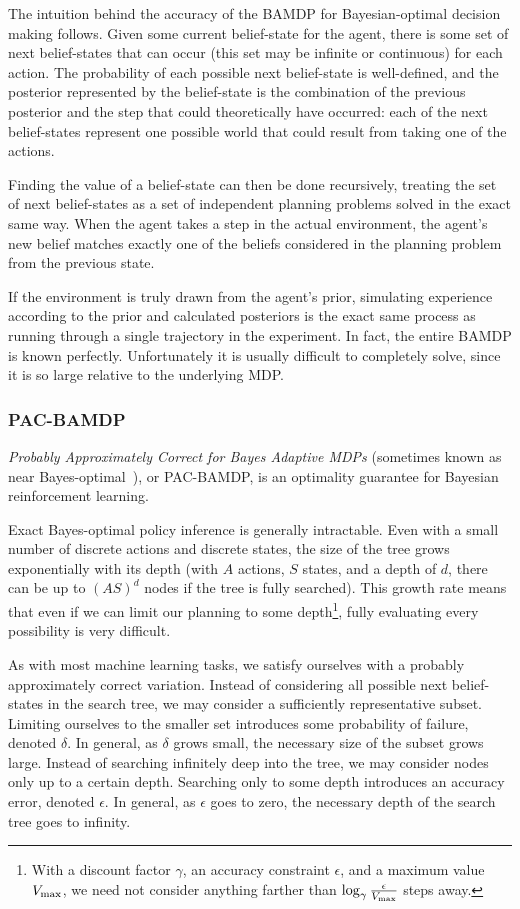 The intuition behind the accuracy of the BAMDP for Bayesian-optimal decision making follows. Given some current belief-state for the agent, there is some set of next belief-states that can occur (this set may be infinite or continuous) for each action. The probability of each possible next belief-state is well-defined, and the posterior represented by the belief-state is the combination of the previous posterior and the step that could theoretically have occurred: each of the next belief-states represent one possible world that could result from taking one of the actions.

Finding the value of a belief-state can then be done recursively, treating the set of next belief-states as a set of independent planning problems solved in the exact same way. When the agent takes a step in the actual environment, the agent's new belief matches exactly one of the beliefs considered in the planning problem from the previous state.

If the environment is truly drawn from the agent's prior, simulating experience according to the prior and calculated posteriors is the exact same process as running through a single trajectory in the experiment. In fact, the entire BAMDP is known perfectly. Unfortunately it is usually difficult to completely solve, since it is so large relative to the underlying MDP.

\subsubsection{PAC-BAMDP}

\emph{Probably Approximately Correct for Bayes Adaptive MDPs} (sometimes known as near Bayes-optimal~\cite{kolter09}), or PAC-BAMDP, is an optimality guarantee for Bayesian reinforcement learning.

Exact Bayes-optimal policy inference is generally intractable. Even with a small number of discrete actions and discrete states, the size of the tree grows exponentially with its depth (with $A$ actions, $S$ states, and a depth of $d$, there can be up to $(A S)^d$ nodes if the tree is fully searched). This growth rate means that even if we can limit our planning to some depth\footnote{With a discount factor $\gamma$, an accuracy constraint $\epsilon$, and a maximum value $V_{\rm max}$, we need not consider anything farther than $\log_\gamma \frac \epsilon {V_{\rm max}}$ steps away.}, fully evaluating every possibility is very difficult.

As with most machine learning tasks, we satisfy ourselves with a probably approximately correct variation. Instead of considering all possible next belief-states in the search tree, we may consider a sufficiently representative subset. Limiting ourselves to the smaller set introduces some probability of failure, denoted $\delta$. In general, as $\delta$ grows small, the necessary size of the subset grows large. Instead of searching infinitely deep into the tree, we may consider nodes only up to a certain depth. Searching only to some depth introduces an accuracy error, denoted $\epsilon$. In general, as $\epsilon$ goes to zero, the necessary depth of the search tree goes to infinity.

